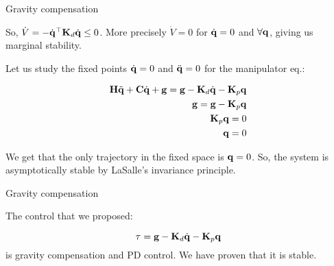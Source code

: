 \documentclass{beamer}
\begin{document}
\begin{frame}{Gravity compensation}
	\begin{flushleft}
		
		So, $\dot V = 
		-\dot{\mathbf{q}}^\top  \mathbf{K}_d \dot{\mathbf{q}} \leq 0$. More precisely $\dot V = 0$ for $\dot{\mathbf{q}} = 0$ and $\forall \mathbf{q}$, giving us marginal stability.
		
		\bigskip
		
		Let us study the fixed points $\dot{\mathbf{q}} = 0$ and $\ddot{\mathbf{q}} = 0$ for the manipulator eq.:
		
		\begin{align}
			\mathbf{H} \ddot{\mathbf{q}} + \mathbf{C} \dot{\mathbf{q}} + \mathbf{g} = \mathbf{g}  - \mathbf{K}_d \dot{\mathbf{q}}  - \mathbf{K}_p \mathbf{q} 
			\\
			\mathbf{g} = \mathbf{g}  - \mathbf{K}_p \mathbf{q} \\
			\mathbf{K}_p \mathbf{q} = 0 \\
			\mathbf{q} = 0
		\end{align}				
	
		We get that the only trajectory in the fixed space is $\mathbf{q} = 0$. So, the system is asymptotically stable by LaSalle's invariance principle.	
		
	\end{flushleft}
\end{frame}




\begin{frame}{Gravity compensation}
	\begin{flushleft}
		
		The control that we proposed:
		
		\begin{equation}
			\tau = \mathbf{g}  - \mathbf{K}_d \dot{\mathbf{q}}  - \mathbf{K}_p \mathbf{q}
		\end{equation}		
	is gravity compensation and PD control. We have proven that it is  stable.
		
	\end{flushleft}
\end{frame}
\end{document}
